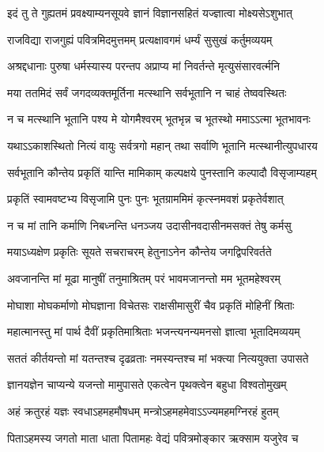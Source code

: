 \twolineshloka
{इदं तु ते गुह्यतमं प्रवक्ष्याम्यनसूयवे}
{ज्ञानं विज्ञानसहितं यज्ज्ञात्वा मोक्ष्यसेऽशुभात्}%

\twolineshloka
{राजविद्या राजगुह्यं पवित्रमिदमुत्तमम्}
{प्रत्यक्षावगमं धर्म्यं सुसुखं कर्तुमव्ययम्}%

\twolineshloka
{अश्रद्दधानाः पुरुषा धर्मस्यास्य परन्तप}
{अप्राप्य मां निवर्तन्ते मृत्युसंसारवर्त्मनि}%

\twolineshloka
{मया ततमिदं सर्वं जगदव्यक्तमूर्तिना}
{मत्स्थानि सर्वभूतानि न चाहं तेष्ववस्थितः}%

\twolineshloka
{न च मत्स्थानि भूतानि पश्य मे योगमैश्वरम्}
{भूतभृन्न च भूतस्थो ममाऽऽत्मा भूतभावनः}%

\twolineshloka
{यथाऽऽकाशस्थितो नित्यं वायुः सर्वत्रगो महान्}
{तथा सर्वाणि भूतानि मत्स्थानीत्युपधारय}%

\twolineshloka
{सर्वभूतानि कौन्तेय प्रकृतिं यान्ति मामिकाम्}
{कल्पक्षये पुनस्तानि कल्पादौ विसृजाम्यहम्}%

\twolineshloka
{प्रकृतिं स्वामवष्टभ्य विसृजामि पुनः पुनः}
{भूतग्राममिमं कृत्स्नमवशं प्रकृतेर्वशात्}%

\twolineshloka
{न च मां तानि कर्माणि निबध्नन्ति धनञ्जय}
{उदासीनवदासीनमसक्तं तेषु कर्मसु}%

\twolineshloka
{मयाऽध्यक्षेण प्रकृतिः सूयते सचराचरम्}
{हेतुनाऽनेन कौन्तेय जगद्विपरिवर्तते}%

\twolineshloka
{अवजानन्ति मां मूढा मानुषीं तनुमाश्रितम्}
{परं भावमजानन्तो मम भूतमहेश्वरम्}%

\twolineshloka
{मोघाशा मोघकर्माणो मोघज्ञाना विचेतसः}
{राक्षसीमासुरीं चैव प्रकृतिं मोहिनीं श्रिताः}%

\twolineshloka
{महात्मानस्तु मां पार्थ दैवीं प्रकृतिमाश्रिताः}
{भजन्त्यनन्यमनसो ज्ञात्वा भूतादिमव्ययम्}%

\twolineshloka
{सततं कीर्तयन्तो मां यतन्तश्च दृढव्रताः}
{नमस्यन्तश्च मां भक्त्या नित्ययुक्ता उपासते}%

\twolineshloka
{ज्ञानयज्ञेन चाप्यन्ये यजन्तो मामुपासते}
{एकत्वेन पृथक्त्वेन बहुधा विश्वतोमुखम्}%

\twolineshloka
{अहं क्रतुरहं यज्ञः स्वधाऽहमहमौषधम्}
{मन्त्रोऽहमहमेवाऽऽज्यमहमग्निरहं हुतम्}%

\twolineshloka
{पिताऽहमस्य जगतो माता धाता पितामहः}
{वेद्यं पवित्रमोङ्कार ऋक्साम यजुरेव च}%


